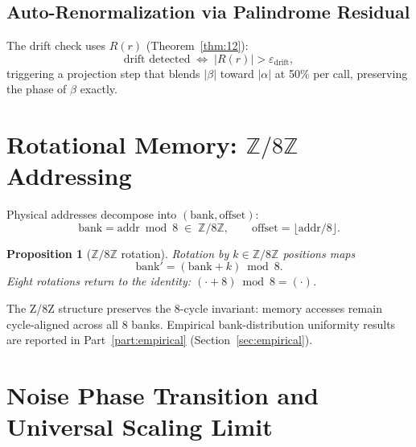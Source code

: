 \documentclass[12pt,a4paper]{article}
\theoremstyle{plain}
\newtheorem{proposition}[theorem]{Proposition}
\theoremstyle{definition}
\theoremstyle{remark}
\newcommand{\Z}{\mathbb{Z}}
\newcommand{\abs}[1]{\lvert #1 \rvert}
\begin{document}
\subsection{Auto-Renormalization via Palindrome Residual}

The drift check uses $R(r)$ (Theorem~\ref{thm:12}):
\begin{equation}
  \text{drift detected} \;\Leftrightarrow\; \abs{R(r)} > \varepsilon_{\mathrm{drift}},
  \label{eq:drift-check}
\end{equation}
triggering a projection step that blends $\abs{\beta}$ toward $\abs{\alpha}$
at 50\% per call, preserving the phase of $\beta$ exactly.

\section{Rotational Memory: \texorpdfstring{$\Z/8\Z$}{Z/8Z} Addressing}
\label{sec:memory}

Physical addresses decompose into $(\text{bank},\text{offset})$:
\begin{equation}
  \text{bank} = \text{addr}\bmod 8 \;\in\; \Z/8\Z,\qquad
  \text{offset} = \lfloor\text{addr}/8\rfloor.
  \label{eq:z8z-addr}
\end{equation}

\begin{proposition}[$\Z/8\Z$ rotation]\label{prop:z8z}
  Rotation by $k\in\Z/8\Z$ positions maps
  \begin{equation}
    \text{bank}' = (\text{bank} + k)\bmod 8.
    \label{eq:z8z-rot}
  \end{equation}
  Eight rotations return to the identity: $(\cdot + 8)\bmod 8 = (\cdot)$.
\end{proposition}

The Z/8Z structure preserves the 8-cycle invariant: memory accesses remain
cycle-aligned across all 8 banks.  Empirical bank-distribution uniformity
results are reported in Part~\ref{part:empirical} (Section~\ref{sec:empirical}).

\section{Noise Phase Transition and Universal Scaling Limit}
\label{sec:noise}
\end{document}
